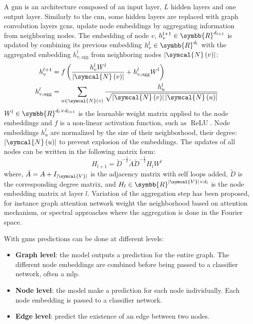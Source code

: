 \documentclass[../main.tex]{subfiles}
\begin{document}
	 A \gls{gnn} is an architecture composed of an input layer, \(L\) hidden layers and one output layer.
	 Similarly to the \gls{cnn}, some hidden layers are replaced with graph convolution layers
	 \Glspl{gcn}, update node embeddings by aggregating information from neighboring nodes.
	 The embedding of node \(v\), \(h^{l+1}_{v} \in \symbb{R}^{d_{l+1}}\) is updated by combining its previous embedding \(h^{l}_{v} \in \symbb{R}^{d_{l}}\) with the aggregated embedding \(h^{l}_{v,\text{agg}}\) from neighboring nodes \(\left|\symcal{N}\left(v\right) \right|\):
	 \begin{align}
		 h^{l+1}_{v}          & = f\left( \frac{h^{l}_{v}W^{l}}{\left|\symcal{N}\left(v\right) \right|} + h^{l}_{v,\text{agg}}W^{l}\right)                                    \\
		 h^{l}_{v,\text{agg}} & = \sum_{u \in \symcal{N}\left(v\right)} \frac{h^{l}_{u}}{\sqrt{\left|\symcal{N}\left(v\right) \right|\left|\symcal{N}\left(u\right) \right|}}
	 \end{align}
	 \(W^{l} \in \symbb{R}^{d_{l}\times d_{l+1}}\) is the learnable weight matrix applied to the node embeddings and \(f\) is a non-linear activation function, such as \(\operatorname{ReLU}\).
	 Node embeddings \(h_{u}^{l}\) are normalized by the size of their neighborhood, \ie{}their degree: \(\left|\symcal{N}\left(u\right) \right|\) to prevent explosion of the embeddings.
	 The updates of all nodes can be written in the following matrix form:
	 \begin{equation}
		 H_{l+1} = \tilde{D}^{-\tfrac12}\tilde{A}\tilde{D}^{-\tfrac12}H_{l}W^{l}
	 \end{equation}
	 where, \(\tilde{A} = A + I_{\left|\symcal{V}\right|}\) is the adjacency matrix with self loops added, \(\tilde{D}\) is the corresponding degree matrix, and \(H_{l} \in \symbb{R}^{\left|\symcal{V}\right| \times d_{l}}\) is the node embedding matrix at layer \(l\).
	 Variation of the aggregation step has been proposed, for instance graph attention network weight the neighborhood based on attention mechanism, or spectral approaches where the aggregation is done in the Fourier space.

	 With \glspl{gnn} predictions can be done at different levels:
	 \begin{itemize}[nosep]
		 \item \textbf{Graph level}: the model outputs a prediction for the entire graph.
		       The different node embeddings are combined before being passed to a classifier network, often a \gls{mlp}.
		 \item \textbf{Node level}: the model make a prediction for each node individually.
		       Each node embedding is passed to a classifier network.
		 \item \textbf{Edge level}: predict the existence of an edge between two nodes.
	 \end{itemize}
\end{document}
